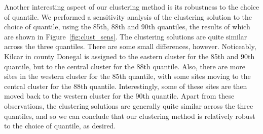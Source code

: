 \documentclass[
  12pt]{article}
\begin{document}
Another interesting aspect of our clustering method is its robustness to the choice of quantile.
We performed a sensitivity analysis of the clustering solution to the choice of quantile, using the 85th, 88th and 90th quantiles, the results of which are shown in Figure~\ref{fig:clust_sens}.
The clustering solutions are quite similar across the three quantiles.
There are some small differences, however. 
Noticeably, Kilcar in county Donegal is assigned to the eastern cluster for the 85th and 90th quantile, but to the central cluster for the 88th quantile.
Also, there are more sites in the western cluster for the 85th quantile, with some sites moving to the central cluster for the 88th quantile. 
Interestingly, some of these sites are then moved back to the western cluster for the 90th quantile.
Apart from these observations, the clustering solutions are generally quite similar across the three quantiles, and so we can conclude that our clustering method is relatively robust to the choice of quantile, as desired. 
\end{document}
